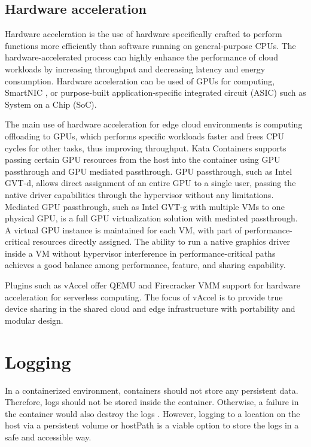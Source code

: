 \subsection{Hardware acceleration}

Hardware acceleration is the use of hardware specifically crafted to perform functions more efficiently than software running on general-purpose CPUs. The hardware-accelerated process can highly enhance the performance of cloud workloads by increasing throughput and decreasing latency and energy consumption. Hardware acceleration can be used of GPUs for computing, SmartNIC \cite{SmartNICIntel}, or purpose-built application-specific integrated circuit (ASIC) such as System on a Chip (SoC).

The main use of hardware acceleration for edge cloud environments is computing offloading to GPUs, which performs specific workloads faster and frees CPU cycles for other tasks, thus improving throughput. Kata Containers supports passing certain GPU resources from the host into the container using GPU passthrough and GPU mediated passthrough. GPU passthrough, such as Intel GVT-d, allows direct assignment of an entire GPU to a single user, passing the native driver capabilities through the hypervisor without any limitations. Mediated GPU passthrough, such as Intel GVT-g with multiple VMs to one physical GPU, is a full GPU virtualization solution with mediated passthrough. A virtual GPU instance is maintained for each VM, with part of performance-critical resources directly assigned. The ability to run a native graphics driver inside a VM without hypervisor interference in performance-critical paths achieves a good balance among performance, feature, and sharing capability. \cite{GPUKataContainers}

Plugins such as vAccel \cite{vAccel} offer QEMU and Firecracker VMM support for hardware acceleration for serverless computing. The focus of vAccel is to provide true device sharing in the shared cloud and edge infrastructure with portability and modular design.
		
\section{Logging}

In a containerized environment, containers should not store any persistent data. Therefore, logs should not be stored inside the container. Otherwise, a failure in the container would also destroy the logs \cite{Toimela2017}. However, logging to a location on the host via a persistent volume or hostPath is a viable option to store the logs in a safe and accessible way. 

